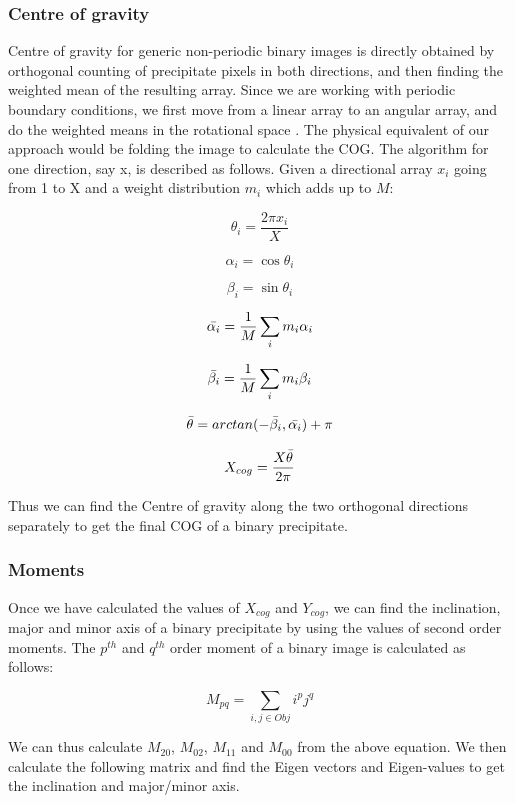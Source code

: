 \documentclass[12pt, a4paper]{report}
\begin{document}
\subsubsection{Centre of gravity}
Centre of gravity for generic non-periodic binary images is directly obtained by orthogonal counting of precipitate pixels in both directions, and then finding the weighted mean of the resulting array. Since we are working with periodic boundary conditions, we first move from a linear array to an angular array, and do the weighted means in the rotational space \cite{30bai2008calculating}. The physical equivalent of our approach would be folding the image to calculate the COG. The algorithm for one direction, say x, is described as follows. Given a directional array $x_i$ going from 1 to X and a weight distribution $m_i$ which adds up to $M$:

$$
\theta_i = \frac{2{\pi}x_i}{X}
$$

$$
\alpha_i = \cos{{\theta}_i}
$$

$$
\beta_i = \sin{{\theta}_i}
$$

$$
\Bar{\alpha_i} = \frac{1}{M}\sum_i {m_i}{\alpha_i}     
$$

$$
\Bar{\beta_i} = \frac{1}{M}\sum_i {m_i}{\beta_i}
$$

$$
\Bar{\theta} = arctan(-\Bar{\beta_i},\Bar{\alpha_i})+\pi
$$

\begin{equation}
    X_{cog} =\frac{X{\Bar{\theta}}}{2\pi}
    \label{Centre of mass for images with Periodic Boundary Conditions}
\end{equation}


Thus we can find the Centre of gravity along the two orthogonal directions separately to get the final COG of a binary precipitate.

\subsubsection{Moments}
Once we have calculated the values of $X_{cog}$ and $Y_{cog}$, we can find the inclination, major and minor axis of a binary precipitate by using the values of second order moments. The $p^{th}$ and $q^{th}$ order moment of a binary image is calculated as follows:

\begin{equation}
    M_{pq} = \sum_{i,j{\in}Obj}i^pj^q
\end{equation}

We can thus calculate $M_{20}$, $M_{02}$, $M_{11}$ and $M_{00}$ from the above equation. We then calculate the following matrix and find the Eigen vectors and Eigen-values to get the inclination and major/minor axis.
\end{document}
